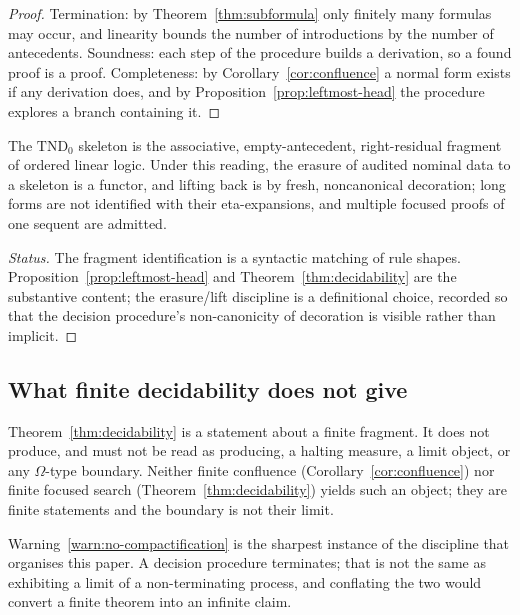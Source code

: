 \begin{proof}
Termination: by Theorem~\ref{thm:subformula} only finitely many formulas may occur, and
linearity bounds the number of introductions by the number of antecedents.  Soundness: each
step of the procedure builds a derivation, so a found proof is a proof.  Completeness: by
Corollary~\ref{cor:confluence} a normal form exists if any derivation does, and by
Proposition~\ref{prop:leftmost-head} the procedure explores a branch containing it.
\end{proof}

\begin{proposition}\label{prop:skeleton-position}
The $\mathrm{TND}_0$ skeleton is the associative, empty-antecedent, right-residual fragment
of ordered linear logic.  Under this reading, the erasure of audited nominal data to a
skeleton is a functor, and lifting back is by fresh, noncanonical decoration; long forms
are not identified with their eta-expansions, and multiple focused proofs of one sequent
are admitted.
\end{proposition}

\begin{proof}[Status]
The fragment identification is a syntactic matching of rule shapes.
Proposition~\ref{prop:leftmost-head} and Theorem~\ref{thm:decidability} are the substantive
content; the erasure/lift discipline is a definitional choice, recorded so that the
decision procedure's non-canonicity of decoration is visible rather than implicit.
\end{proof}

\subsection{What finite decidability does not give}

\begin{warning}\label{warn:no-compactification}
Theorem~\ref{thm:decidability} is a statement about a finite fragment.  It does not
produce, and must not be read as producing, a halting measure, a limit object, or any
$\Omega$-type boundary.  Neither finite confluence
(Corollary~\ref{cor:confluence}) nor finite focused search
(Theorem~\ref{thm:decidability}) yields such an object; they are finite statements and the
boundary is not their limit.
\end{warning}

\begin{remark}
Warning~\ref{warn:no-compactification} is the sharpest instance of the discipline that
organises this paper.  A decision procedure terminates; that is not the same as exhibiting
a limit of a non-terminating process, and conflating the two would convert a finite theorem
into an infinite claim.
\end{remark}

